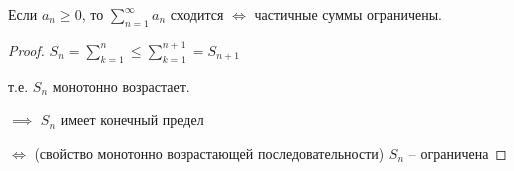 
\begin{theorem} \thmslashn 
    
    Если $a_n \ge 0$, то $\sum\limits_{n=1}^{\infty}a_n$ сходится $\iff$ частичные суммы ограничены.

    \begin{proof} \thmslashn 
        
        $S_n = \sum\limits_{k = 1}^{n} \le \sum\limits_{k = 1}^{n + 1} = S_{n + 1}$

        т.е. $S_n$ монотонно возрастает.

        $\implies$ $S_n$ имеет конечный предел 
        
        $\iff$ (свойство монотонно возрастающей последовательности) $S_n$ -- ограничена
    \end{proof}
\end{theorem}

